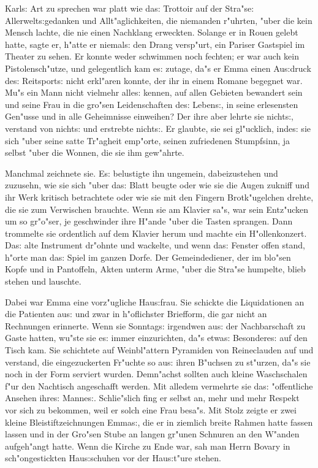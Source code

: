 \documentclass[oneside,12pt]{book}
\newcommand{\s}{s:}%
\begin{document}
Karl{\s} Art zu sprechen war platt wie da{\s} Trottoir auf der
Stra"se: Allerwelt{\s}gedanken und Allt"aglichkeiten, die
niemanden r"uhrten, "uber die kein Mensch lachte, die nie einen
Nachklang erweckten. Solange er in Rouen gelebt hatte, sagte er,
h"atte er niemal{\s} den Drang versp"urt, ein Pariser Gastspiel im
Theater zu sehen. Er konnte weder schwimmen noch fechten; er war
auch kein Pistolensch"utze, und gelegentlich kam e{\s} zutage,
da"s er Emma einen Au{\s}druck de{\s} Reitsport{\s} nicht
erkl"aren konnte, der ihr in einem Romane begegnet war. Mu"s ein
Mann nicht vielmehr alle{\s} kennen, auf allen Gebieten bewandert
sein und seine Frau in die gro"sen Leidenschaften de{\s}
Leben{\s}, in seine erlesensten Gen"usse und in alle Geheimnisse
einweihen? Der ihre aber lehrte sie nicht{\s}, verstand von
nicht{\s} und erstrebte nicht{\s}. Er glaubte, sie sei gl"ucklich,
inde{\s} sie sich "uber seine satte Tr"agheit emp"orte, seinen
zufriedenen Stumpfsinn, ja selbst "uber die Wonnen, die sie ihm
gew"ahrte.

Manchmal zeichnete sie. E{\s} belustigte ihn ungemein,
dabeizustehen und zuzusehn, wie sie sich "uber da{\s} Blatt beugte
oder wie sie die Augen zukniff und ihr Werk kritisch betrachtete
oder wie sie mit den Fingern Brotk"ugelchen drehte, die sie zum
Verwischen brauchte. Wenn sie am Klavier sa"s, war sein Ent\/z"ucken
um so gr"o"ser, je geschwinder ihre H"ande "uber die Tasten
sprangen. Dann trommelte sie ordentlich auf dem Klavier herum und
machte ein H"ollenkonzert. Da{\s} alte Instrument dr"ohnte und
wackelte, und wenn da{\s} Fenster offen stand, h"orte man da{\s}
Spiel im ganzen Dorfe. Der Gemeindediener, der im blo"sen Kopfe
und in Pantoffeln, Akten unterm Arme, "uber die Stra"se humpelte,
blieb stehen und lauschte.

Dabei war Emma eine vorz"ugliche Hau{\s}frau. Sie schickte die
Liquidationen an die Patienten au{\s} und zwar in h"oflichster
Briefform, die gar nicht an Rechnungen erinnerte. Wenn sie
Sonntag{\s} irgendwen au{\s} der Nachbarschaft zu Gaste hatten,
wu"ste sie e{\s} immer einzurichten, da"s etwa{\s} Besondere{\s}
auf den Tisch kam. Sie schichtete auf Weinbl"attern Pyramiden von
Reineclauden auf und verstand, die eingezuckerten Fr"uchte so
au{\s} ihren B"uchsen zu st"urzen, da"s sie noch in der Form
serviert wurden. Demn"achst sollten auch kleine Waschschalen f"ur
den Nachtisch angeschafft werden. Mit alledem vermehrte sie da{\s}
"offentliche Ansehen ihre{\s} Manne{\s}. Schlie"slich fing er
selbst an, mehr und mehr Respekt vor sich zu bekommen, weil er
solch eine Frau besa"s. Mit Stolz zeigte er zwei kleine
Bleistift\/zeichnungen Emma{\s}, die er in ziemlich breite Rahmen
hatte fassen lassen und in der Gro"sen Stube an langen gr"unen
Schnuren an den W"anden aufgeh"angt hatte. Wenn die Kirche zu Ende
war, sah man Herrn Bovary in sch"ongestickten Hau{\s}schuhen vor
der Hau{\s}t"ure stehen.
\end{document}
